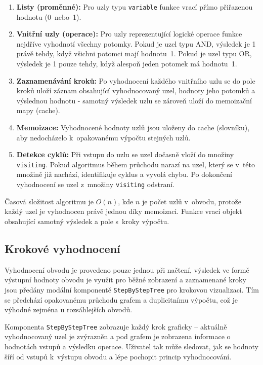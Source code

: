 \begin{enumerate}
    \item \textbf{Listy (proměnné):} Pro uzly typu \texttt{variable} funkce vrací přímo přiřazenou hodnotu (0~nebo~1).
    
    \item \textbf{Vnitřní uzly (operace):} Pro uzly reprezentující logické operace funkce nejdříve vyhodnotí všechny potomky. Pokud je uzel typu AND, výsledek je 1 právě tehdy, když všichni potomci mají hodnotu~1. Pokud je uzel typu OR, výsledek je 1 pouze tehdy, když alespoň jeden potomek má hodnotu~1.
    
    \item \textbf{Zaznamenávání kroků:} Po vyhodnocení každého vnitřního uzlu se do pole kroků uloží záznam obsahující vyhodnocovaný uzel, hodnoty jeho potomků a výslednou hodnotu - samotný výsledek uzlu se zároveň uloží do memoizační mapy (cache).
    
    \item \textbf{Memoizace:} Vyhodnocené hodnoty uzlů jsou uloženy do cache (slovníku), aby nedocházelo k~opakovanému výpočtu stejných uzlů.
    
    \item \textbf{Detekce cyklů:} Při vstupu do uzlu se uzel dočasně vloží do množiny \texttt{visiting}. Pokud algoritmus během průchodu narazí na uzel, který se v~této množině již nachází, identifikuje cyklus a vyvolá chybu. Po dokončení vyhodnocení se uzel z~množiny \texttt{visiting} odstraní.
\end{enumerate}

Časová složitost algoritmu je $O(n)$, kde $n$ je počet uzlů v~obvodu, protože každý uzel je vyhodnocen právě jednou díky memoizaci. Funkce vrací objekt obsahující samotný výsledek a pole s~kroky výpočtu.

\subsection{Krokové vyhodnocení}
\label{sec:MCVPStepByStepImpl}

Vyhodnocení obvodu je provedeno pouze jednou při načtení, výsledek ve formě výstupní hodnoty obvodu je využit pro běžné zobrazení a zaznamenané kroky jsou předány modální komponentě \texttt{StepByStepTree} pro krokovou vizualizaci. Tím se předchází opakovanému průchodu grafem a duplicitnímu výpočtu, což je výhodné zejména u rozsáhlejších obvodů.

Komponenta \texttt{StepByStepTree} zobrazuje každý krok graficky -- aktuálně vyhodnocovaný uzel je zvýrazněn a pod grafem je zobrazena informace o hodnotách vstupů a výsledku operace. Uživatel tak může sledovat, jak se hodnoty šíří od vstupů k~výstupu obvodu a lépe pochopit princip vyhodnocování.

